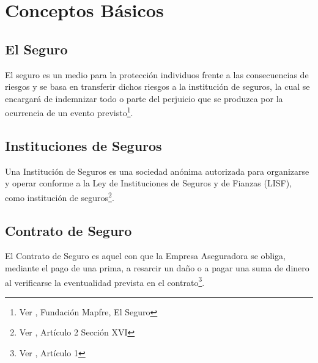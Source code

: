 \documentclass[11pt,twoside,openright,spanish]{report}
\numberwithin{equation}{chapter}
\numberwithin{figure}{chapter}
\numberwithin{table}{chapter}
\renewcommand{\footrulewidth}{0pt}
\renewcommand{\headrulewidth}{0.1pt}
\begin{document}
	
	\fancypagestyle{plain}{
		\fancyhead[L]{}
		\fancyhead[C]{}
		\fancyhead[R]{}
		
		\fancyfoot[L]{}
		\fancyfoot[C]{\thepage}
		\fancyfoot[R]{}
		\renewcommand{\headrulewidth}{0pt}
		\renewcommand{\footrulewidth}{0pt}
	}
	
	\fancyhead[LE]{\scshape\thepage\hspace{1cm}\footnotesize\nouppercase{\leftmark}}
	\fancyhead[LO]{}
	\fancyhead[RE]{}
	\pagestyle{fancy}
	\cleardoublepage


	\chapter{Conceptos Básicos}

	\section{El Seguro}
	El seguro es un medio para la protección individuos frente a las consecuencias de riesgos y se basa en transferir dichos riesgos a la institución de seguros, la cual se encargará de indemnizar todo o parte del perjuicio que se produzca por la ocurrencia de un evento previsto\footnote{Ver \citet{ASeguro}, Fundación Mapfre, El Seguro}.
	
	\section{Instituciones de Seguros}

	Una Institución de Seguros es una sociedad anónima autorizada para organizarse y operar conforme a la Ley de Instituciones de Seguros y de Fianzas (LISF), como institución de seguros\footnote{Ver \citet{BAseguradora}, Artículo 2 Sección XVI}.

 
	
	\section{Contrato de Seguro}
	
	El Contrato de Seguro es aquel con que la Empresa Aseguradora se obliga, mediante el pago de una prima, a resarcir un daño o a pagar una suma de dinero al verificarse la eventualidad prevista en el contrato\footnote{Ver \citet{CContrato}, Artículo 1}.
	
\end{document}

